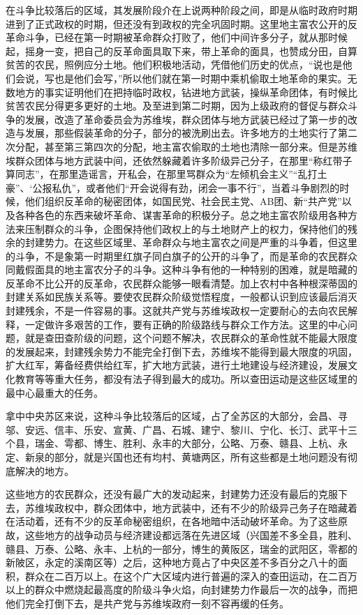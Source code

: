 在斗争比较落后的区域，其发展阶段介在上说两种阶段之间，即是从临时政府时期进到了正式政权的时期，但还没有到政权的完全巩固时期。这里地主富农公开的反革命斗争，已经在第一时期被革命群众打败了，他们中间许多分子，就从那时候起，摇身一变，把自己的反革命面具取下来，带上革命的面具，也赞成分田，自算贫苦的农民，照例应分土地。他们积极地活动，凭借他们历史的优点，“说也是他们会说，写也是他们会写，”所以他们就在第一时期中乘机偷取土地革命的果实。无数地方的事实证明他们在把持临时政权，钻进地方武装，操纵革命团体，有时候比贫苦农民分得更多更好的土地。及至进到第二时期，因为上级政府的督促与群众斗争的发展，改造了革命委员会为苏维埃，群众团体与地方武装已经过了第一步的改造与发展，那些假装革命的分子，部分的被洗刷出去。许多地方的土地实行了第二次分配，甚至第三第四次的分配，地主富农偷取的土地也清除一部分来。但是苏维埃群众团体与地方武装中间，还依然躲藏着许多阶级异己分子，在那里“称红带子算同志”，在那里造谣言，开私会，在那里骂群众为“左倾机会主义”“乱打土豪”、‘公报私仇”，或者他们“开会说得有劲，闭会一事不行”，当着斗争剧烈的时候，他们组织反革命的秘密团体，如国民党、社会民主党、AB团、新“共产党”以及各种各色的东西来破坏革命、谋害革命的积极分子。总之地主富农阶级用各种方法来压制群众的斗争，企图保持他们政权上的与土地财产上的权力，保持他们的残余的封建势力。在这些区域里、革命群众与地主富农之间是严重的斗争着，但这里的斗争，不是象第一时期里红旗子同白旗子的公开的斗争了，而是革命的农民群众同戴假面具的地主富农分子的斗争。这种斗争有他的一种特别的困难，就是暗藏的反革命不比公开的反革命，农民群众能够一眼看清楚。加上农村中各种根深蒂固的封建关系如民族关系等。要使农民群众阶级觉悟程度，一般都认识到应该最后消灭封建残余，不是一件容易的事。这就共产党与苏维埃政权一定要耐心的去向农民解释，一定做许多艰苦的工作，要有正确的阶级路线与群众工作方法。这里的中心问题，就是查田查阶级的问题，这个问题不解决，农民群众的革命性就不能最大限度的发展起来，封建残余势力不能完全打倒下去，苏维埃不能得到最大限度的巩固，扩大红军，筹备经费供给红军，扩大地方武装，进行土地建设与经济建设，发展文化教育等等重大任务，都没有法子得到最大的成功。所以查田运动是这些区域里的最中心最重大的任务。

拿中中央苏区来说，这种斗争比较落后的区域，占了全苏区的大部分，会昌、寻邬、安远、信丰、乐安、宣黄、广昌、石城、建宁、黎川、宁化、长汀、武平十三个县，瑞金、雩都、博生、胜利、永丰的大部分，公略、万泰、赣县、上杭、永定、新泉的部分，就是兴国也还有均村、黄塘两区，所有这些都是土地问题没有彻底解决的地方。

这些地方的农民群众，还没有最广大的发动起来，封建势力还没有最后的克服下去，苏维埃政权中，群众团体中，地方武装中，还有不少的阶级异己务子在暗藏着在活动着，还有不少的反革命秘密组织，在各地暗中活动破坏革命。为了这些原故，这些地方的战争动员与经济建设都远落在先进区域（兴国差不多全县，胜利、赣县、万泰、公略、永丰、上杭的一部分，博生的黄阪区，瑞金的武阳区，零都的新陂区，永定的溪南区等）之后，这种地方竟占了中央区差不多百分之八十的面积，群众在二百万以上。在这个广大区域内进行普遍的深入的查田运动，在二百万以上的群众中燃烧起最高度的阶级斗争火焰，向封建势力作最后一次的战争，而把他们完全打倒下去，是共产党与苏维埃政府一刻不容再缓的任务。

